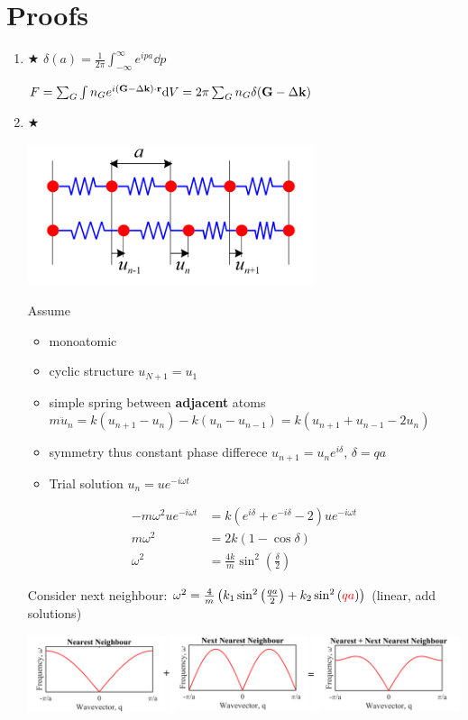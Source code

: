 \documentclass{article}
\theoremstyle{remark}
\theoremstyle{remark}
\newcommand{\myref}[1]{\hyperref[back:#1]{$\bigstar$}\label{#1}}
\begin{document}
\section*{Proofs}
\begin{enumerate}
    \item \myref{thm:diffrac_proof} $\delta(a) = \frac{1}{2\pi}\int_{-\infty}^{\infty}e^{ipa}\dd p$
    
        $F = \sum_G\int n_G e^{i(\vb{G}-\Delta\vb{k})\cdot\vb{r}}\dd V = 2\pi\sum_G n_G\delta(\vb{G}-\Delta\vb{k})$

    \item \myref{thm:phonon_disper} 
        \begin{center}
            \includegraphics*[width=0.4\linewidth]{cmp_phonon_dipersion_derivation.png}
        \end{center}

        Assume \begin{itemize}
            \item monoatomic
            \item cyclic structure $u_{N+1}=u_1$
            \item simple spring between \textbf{adjacent} atoms $m\ddot{u}_n = k(u_{n+1}-u_n)-k(u_n-u_{n-1})=k(u_{n+1}+u_{n-1}-2u_n)$
            \item symmetry thus constant phase differece $u_{n+1}=u_n e^{i\delta}$, $\delta=qa$
            \item Trial solution $u_n = ue^{-i\omega t}$
        \end{itemize}
        \begin{align*}
            -m\omega^2ue^{-i\omega t}&=k(e^{i\delta}+e^{-i\delta}-2)ue^{-i\omega t}\\
            m\omega^2 &= 2k(1-\cos\delta)\\
            \omega^2 &= \frac{4k}{m}\sin^2\left(\frac{\delta}{2}\right)
        \end{align*}

        Consider next neighbour:
        $\omega^2=\frac{4}{m}\left(k_1\sin^2\left(\frac{qa}{2}\right)+k_2\sin^2\left(\textcolor{red}{qa}\right)\right)$ (linear, add solutions)
        \begin{center}
            \includegraphics*[width=0.95\linewidth]{cmp_phonon_next_nea_nei.png}
        \end{center}


\end{enumerate}
\end{document}
